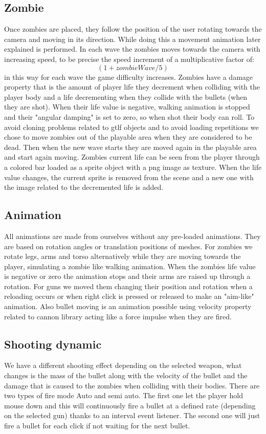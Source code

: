 \documentclass[14pt]{extarticle}
\begin{document}
\subsection {Zombie}
Once zombies are placed, they follow the position of the user rotating towards the camera and moving in its direction. While doing this a movement animation later explained is performed. In each wave the zombies moves towards the camera with increasing speed, to be precise the speed increment of a multiplicative factor of: $$(1+zombieWave/5)$$ in this way for each wave the game difficulty increases.
Zombies have a damage property that is the amount of player life they decrement when colliding with the player body and a life decrementing when they collide with the bullets (when they are shot). When their life value is negative, walking animation is stopped and their "angular damping" is set to zero, so when shot their body can roll. To avoid cloning problems related to gtlf objects and to avoid loading repetitions we chose to move zombies out of the playable area when they are considered to be dead. Then when the new wave starts they are moved again in the playable area and start again moving.
Zombies current life can be seen from the player through a colored bar loaded as a sprite object with a png image as texture. When the life value changes, the current sprite is removed from the scene and a new one with the image related to the decremented life is added.

\subsection {Animation}
All animations are made from ourselves without any pre-loaded animations. They are based on rotation angles  or translation positions of meshes. For zombies we rotate legs, arms and torso alternatively while they are moving towards the player, simulating a zombie like walking animation. When the zombies life value is negative or zero the animation stops and their arms are raised up through a rotation. For guns we moved them changing their position and rotation when a reloading occurs or when right click is pressed or released to make an "aim-like" animation. Also bullet moving is an animation possible using velocity property related to cannon library acting like a force impulse  when they are fired.

\subsection {Shooting dynamic}
	We have a different shooting effect depending on the selected weapon, what changes is the mass of the bullet along with the velocity of the bullet and the damage that is caused to the zombies when colliding with their bodies.  There are two types of fire mode Auto and semi auto.
	The first one let the player hold mouse down and this will continuously fire a bullet at a defined rate (depending on the selected gun) thanks to an interval event listener. The second one will just fire a bullet for each click if not waiting for the next bullet.
\end{document}
